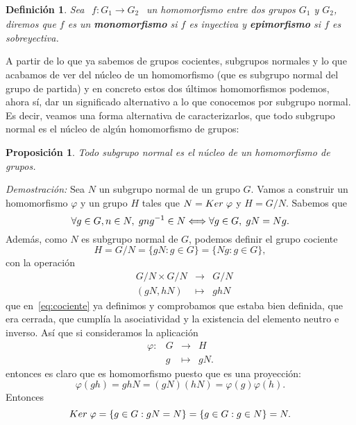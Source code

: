 \documentclass[12pt]{article}
\newtheorem{proposition}[theorem]{Proposición}
\newtheorem{definition}[theorem]{Definición}
\begin{document}
\begin{definition}Sea $
\begin{array}{rccl}
f\colon G_{1} \longrightarrow  G_{2}
\end{array}
$ un homomorfismo entre dos grupos $G_{1}$ y $G_{2}$, diremos que $f$ es un \textbf{monomorfismo} si $f$ es inyectiva y \textbf{epimorfismo} si $f$ es sobreyectiva.
\end{definition}

A partir de lo que ya sabemos de grupos cocientes, subgrupos normales y lo que acabamos de ver del núcleo de un homomorfismo (que es subgrupo normal del grupo de partida) y en concreto estos dos últimos homomorfismos podemos, ahora sí, dar un significado alternativo a lo que conocemos por subgrupo normal. Es decir, veamos una forma alternativa de caracterizarlos, que todo subgrupo normal es el núcleo de algún homomorfismo de grupos:

\begin{proposition} Todo subgrupo normal es el núcleo de un homomorfismo de grupos.
\end{proposition}
\emph{Demostración: } Sea $N$ un subgrupo normal de un grupo $G$. Vamos a construir un homomorfismo $\varphi$ y un grupo $H$ tales que $N = Ker \hspace{0.1cm} \varphi$ y $H = G/N$. Sabemos que $$\forall g \in G, n \in N, \hspace{0.1cm} gng^{-1} \in N \Longleftrightarrow \forall g \in G, \hspace{0.1cm} gN = Ng.$$ Además, como $N$ es subgrupo normal de $G$, podemos definir el grupo cociente $$H = G/N  = \lbrace gN :g \in G \rbrace = \lbrace Ng : g \in G\rbrace,$$ con la operación $$\begin{array}{rccl}
&G/N \times G/N & \longrightarrow & G/N\\
&(gN,hN)& \longmapsto &ghN
\end{array}
$$ que en~\ref{eq:cociente} ya definimos y comprobamos que estaba bien definida, que era cerrada, que cumplía la asociatividad y la existencia del elemento neutro e inverso. Así que si consideramos la aplicación $$\begin{array}{rccl}
\varphi \colon &G & \longrightarrow & H\\
&g & \longmapsto &gN.
\end{array}
$$  entonces es claro que es homomorfismo puesto que es una proyección: $$\varphi(gh) = ghN = (gN)(hN) = \varphi(g) \varphi(h).$$ Entonces $$Ker\hspace{0.1cm} \varphi = \lbrace g \in G : gN = N \rbrace = \lbrace g \in G : g \in N \rbrace = N.$$
\end{document}

